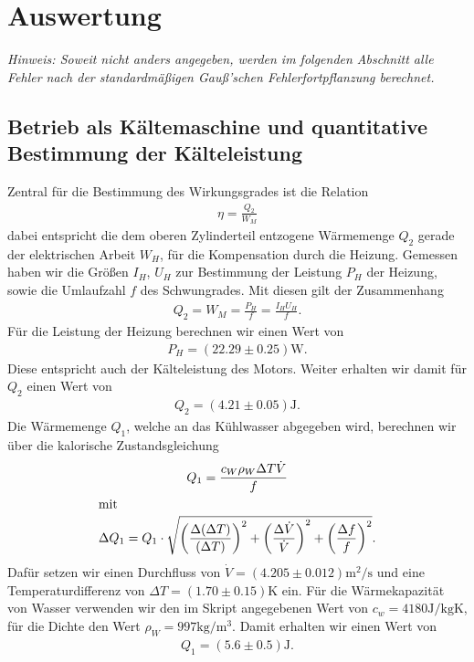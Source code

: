 \section{Auswertung}

\textit{Hinweis: Soweit nicht anders angegeben, werden im folgenden Abschnitt alle Fehler nach der standardmäßigen Gauß'schen Fehlerfortpflanzung berechnet.}

\subsection{Betrieb als Kältemaschine und quantitative Bestimmung der Kälteleistung}

Zentral für die Bestimmung des Wirkungsgrades ist die Relation
\begin{align}
    \eta = \frac{Q_2}{W_M}
\end{align}
dabei entspricht die dem oberen Zylinderteil entzogene Wärmemenge $Q_2$ gerade der elektrischen Arbeit $W_H$, für die Kompensation durch die Heizung. Gemessen haben wir die Größen $I_H$, $U_H$ zur Bestimmung der Leistung $P_H$ der Heizung, sowie die Umlaufzahl $f$ des Schwungrades. Mit diesen gilt der Zusammenhang
\begin{align}
    Q_2 = W_M = \frac{P_H}{f} = \frac{I_H U_H}{f}.
\end{align}
Für die Leistung der Heizung berechnen wir einen Wert von
\begin{align*}
    P_H = (22.29 \pm 0.25) \si{\watt}.
\end{align*}
Diese entspricht auch der Kälteleistung des Motors. Weiter erhalten wir damit für $Q_2$ einen Wert von
\begin{align*}
    Q_2 = (4.21 \pm 0.05) \si{\joule}.
\end{align*}
Die Wärmemenge $Q_1$, welche an das Kühlwasser abgegeben wird, berechnen wir über die kalorische Zustandsgleichung
\begin{gather}
    Q_1 = \frac{c_W \rho_W \Delta T \dot{V}}{f} \label{eq:kalo_zust}\\
    \intertext{mit}
    \Delta Q_1 = Q_1 \cdot \sqrt{\qty(\frac{\Delta (\Delta T)}{(\Delta T)})^{2} + \qty(\frac{\Delta \dot{V}}{\dot{V}})^{2} + \qty(\frac{\Delta f}{f})^{2}}.
\end{gather}
Dafür setzen wir einen Durchfluss von $\dot{V} = (4.205 \pm 0.012) \unit{\meter\squared\per\second}$ und eine Temperaturdifferenz von $\Delta T = (1.70 \pm 0.15) \si{\kelvin}$ ein. Für die Wärmekapazität von Wasser verwenden wir den im Skript angegebenen Wert von $c_w = 4180 \si{\joule\per\kilo\gram\kelvin}$, für die Dichte den Wert $\rho_W = 997\si{\kilo\gram\per\meter\cubed}$. Damit erhalten wir einen Wert von
\begin{align}
    Q_1 = (5.6 \pm 0.5) \si{\joule}.
\end{align}

